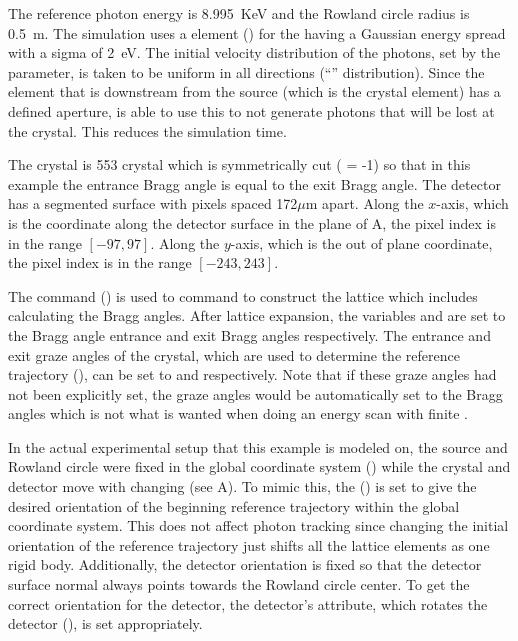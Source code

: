 The reference photon energy is 8.995~KeV and the Rowland circle radius is 0.5~m. The simulation uses
a  element () for the  having a Gaussian energy
spread with a sigma of 2~eV.  The initial velocity distribution of the photons, set by the
 parameter, is taken to be uniform in all directions (``''
distribution). Since the element that is downstream from the source (which is the crystal element)
has a defined aperture, \bmad is able to use this to not generate photons that will be lost at the
crystal. This reduces the simulation time.

The crystal is  553 crystal which is symmetrically cut ( = -1) so that in
this example the entrance Bragg angle is equal to the exit Bragg angle.  The detector has a
segmented surface with pixels spaced 172$\mu$m apart. Along the $x$-axis, which is the coordinate
along the detector surface in the plane of A, the pixel index is in the range $[-97,
97]$. Along the $y$-axis, which is the out of plane coordinate, the pixel index is in the range
$[-243,243]$.

The  command () is used to command \bmad to construct the
lattice which includes calculating the Bragg angles. After lattice expansion, the variables
 and  are set to the Bragg angle entrance and exit Bragg angles
respectively. The entrance and exit graze angles of the crystal, which are used to determine the
reference trajectory (), can be set to  and  respectively. Note that if these graze angles had not been explicitly set, the graze angles
would be automatically set to the Bragg angles which
is not what is wanted when doing an energy scan with finite .

In the actual experimental setup that this example is modeled on, the source and Rowland circle were
fixed in the global coordinate system () while the crystal and detector move with
changing  (see A). To mimic this, the 
() is set to give the desired orientation of the beginning reference trajectory
within the global coordinate system. This does not affect photon tracking since changing the initial
orientation of the reference trajectory just shifts all the lattice elements as one rigid
body. Additionally, the detector orientation is fixed so that the detector surface normal always
points towards the Rowland circle center. To get the correct orientation for the detector, the
detector's  attribute, which rotates the detector (), is set appropriately.

